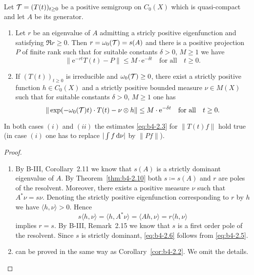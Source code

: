 \begin{corollary}\label{cor:b4-2.11}%
%
Let $\mathcal{T} = (T(t))_{t \geq 0}$ be a positive semigroup on $C_{0}(X)$ which is quasi-compact and let $A$ be its generator.
\begin{enumerate}[\upshape (i)]
	\item	
	Let $r$ be an eigenvalue of $A$ admitting a stricly positive eigenfunction and satisfying $\Re r \geq 0$. 
    Then $r = \omega_{0}(\mathcal{T}) = s(A)$ and there is a positive projection $P$ of finite rank such that for suitable constants $\delta > 0$, $M \geq 1$ we have
	\begin{equation}\label{eq:b4-2.6}
		\|\mathrm{e}^{-rt}T(t) - P\| \leq M \cdot \mathrm{e}^{-\delta t} \quad \text{for all} \quad t \geq 0 \text{.}
	\end{equation}
	
	\item 
	If $(T(t))_{t \geq 0}$ is irreducible and $\omega_{0}(\mathcal{T}) \geq 0$, there exist a strictly positive function $h \in C_{0}(X)$ and a strictly positive bounded measure $\nu \in M(X)$ such that for suitable constants $\delta > 0$, $M \geq 1$ one has
	\begin{equation}\label{eq:b4-2.7}
		\|\exp(-\omega_{0}(\mathcal{T})t) \cdot T(t) - \nu \otimes h\| \leq M \cdot \mathrm{e}^{-\delta t} \quad \text{for all} \quad t \geq 0 \text{.}
	\end{equation}
\end{enumerate}
In both cases $(i)$ and $(ii)$ the estimates \eqref{eq:b4-2.3} for $\|T(t)f\|$ hold true (in case $(i)$ one has to replace $|\int f \mathop{}\!\mathrm{d}{\nu}|$ by $\|Pf\|$).
\end{corollary}
\begin{proof}
	\begin{enumerate}[\upshape (i), wide, labelindent=.5em]
		\item 
		By B-III, Corollary~2.11 we know that $s(A)$ is a strictly dominant eigenvalue of $A$. 
        By Theorem~\ref{thm:b4-2.10} both $s  \coloneq  s(A)$ and $r$ are poles of the resolvent. 
        Moreover, there exists a positive measure $\nu$ such that $A^*\nu = s\nu$. 
        Denoting the strictly positive eigenfunction corresponding to $r$ by $h$ we have $\langle h,\nu \rangle > 0$. 
        Hence 
%
\[
	s\langle h,\nu \rangle = \langle h,A^*\nu \rangle = \langle Ah,\nu \rangle = r\langle h,\nu \rangle
\]
%
implies $r = s$. By B-III, Remark~2.15 we know that $s$ is a first order pole of the resolvent. Since $s$ is strictly dominant, \eqref{eq:b4-2.6} follows from \eqref{eq:b4-2.5}.

		\item 
		can be proved in the same way as Corollary~\ref{cor:b4-2.2}. We omit the details.
	\end{enumerate}
\end{proof}
